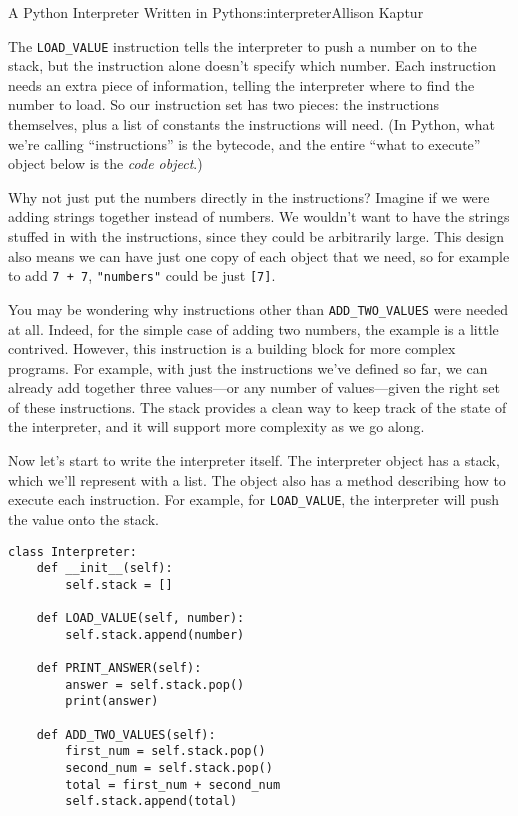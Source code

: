 \begin{aosachapter}{A Python Interpreter Written in Python}{s:interpreter}{Allison Kaptur}

The \texttt{LOAD\_VALUE} instruction tells the interpreter to push a
number on to the stack, but the instruction alone doesn't specify which
number. Each instruction needs an extra piece of information, telling
the interpreter where to find the number to load. So our instruction set
has two pieces: the instructions themselves, plus a list of constants
the instructions will need. (In Python, what we're calling
``instructions'' is the bytecode, and the entire ``what to execute''
object below is the \emph{code object}.)

Why not just put the numbers directly in the instructions? Imagine if we
were adding strings together instead of numbers. We wouldn't want to
have the strings stuffed in with the instructions, since they could be
arbitrarily large. This design also means we can have just one copy of
each object that we need, so for example to add \texttt{7 + 7},
\texttt{"numbers"} could be just \texttt{{[}7{]}}.

You may be wondering why instructions other than
\texttt{ADD\_TWO\_VALUES} were needed at all. Indeed, for the simple
case of adding two numbers, the example is a little contrived. However,
this instruction is a building block for more complex programs. For
example, with just the instructions we've defined so far, we can already
add together three values---or any number of values---given the right
set of these instructions. The stack provides a clean way to keep track
of the state of the interpreter, and it will support more complexity as
we go along.

Now let's start to write the interpreter itself. The interpreter object
has a stack, which we'll represent with a list. The object also has a
method describing how to execute each instruction. For example, for
\texttt{LOAD\_VALUE}, the interpreter will push the value onto the
stack.

\begin{verbatim}
class Interpreter:
    def __init__(self):
        self.stack = []

    def LOAD_VALUE(self, number):
        self.stack.append(number)

    def PRINT_ANSWER(self):
        answer = self.stack.pop()
        print(answer)

    def ADD_TWO_VALUES(self):
        first_num = self.stack.pop()
        second_num = self.stack.pop()
        total = first_num + second_num
        self.stack.append(total)
\end{verbatim}


\end{aosachapter}
